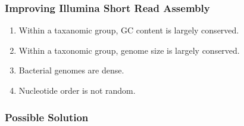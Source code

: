 \documentclass[10pt, compress]{beamer}
\begin{document}
\begin{frame}[fragile]
  \frametitle{Improving Illumina Short Read Assembly}
\begin{enumerate}
\item Within a taxanomic group, GC content is largely conserved.
\item Within a taxonomic group, genome size is largely conserved.
\item Bacterial genomes are dense.
\item Nucleotide order is not random.
\end{enumerate}

\end{frame}
\begin{frame}[fragile]
  \frametitle{Possible Solution}
  \begin{figure}




\end{figure}
\end{frame}
\end{document}
